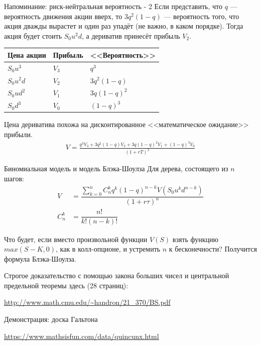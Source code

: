 \documentclass{beamer}
\begin{document}
\begin{frame}{Напоминание: риск-нейтральная вероятность - 2}
\justify
Если представить, что $q$ --- вероятность движения акции вверх, то $3q^2(1-q)$ --- вероятность того, что акция дважды вырастет и один раз упадёт (не важно, в каком порядке). Тогда акция будет стоить $S_0u^2d$, а дериватив принесёт прибыль $V_2$.

\justify
\centering
\begin{tabular}{l|l|l}
Цена акции & Прибыль & <<Вероятность>> \\ \hline
$S_0u^3$   & $V_3$   & $q^3$ \\
$S_0u^2d$  & $V_2$   & $3q^2(1-q)$ \\
$S_0ud^2$  & $V_1$   & $3q(1-q)^2$ \\ 
$S_0d^3$   & $V_0$   & $(1-q)^3$ 
\end{tabular}

\justify
Цена дериватива похожа на дисконтированное <<математическое ожидание>> прибыли.
\begin{align*}
V = \frac{q^3V_3 + 3q^2(1-q)V_2 + 3q(1-q)^2V_1 + (1-q)^3V_0}{(1+rT)^3}
\end{align*}
\end{frame}



\begin{frame}{Биномиальная модель и модель Блэка-Шоулза}
Для дерева, состоящего из $n$ шагов:
\begin{align*}
V &= \dfrac{\sum\limits_{k=0}^{n} C^k_nq^k(1-q)^{n-k}V(S_0u^kd^{n-k})}{(1+r\tau)^n} \\
C^k_n &= \dfrac{n!}{k!(n-k)!}
\end{align*}

\justify
Что будет, если вместо произвольной функции $V(S)$ взять функцию $max(S-K,0)$, как в колл-опционе, и устремить $n$ к бесконечности? Получится формула Блэка-Шоулза.

\vspace{\baselineskip}
Строгое доказательство с помощью закона больших чисел и центральной
предельной теоремы здесь (28 страниц):

\url{http://www.math.cmu.edu/~handron/21_370/BS.pdf}
\end{frame}



\begin{frame}{Демонстрация: доска Гальтона}

\url{https://www.mathsisfun.com/data/quincunx.html}
\end{frame}
\end{document}
